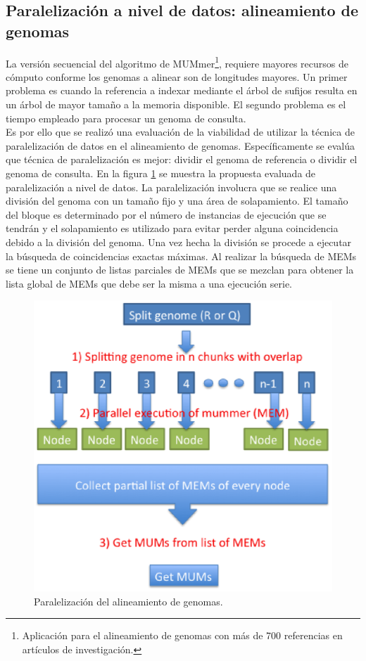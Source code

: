 \documentclass[12pt,a4paper]{article}
\begin{document}
\subsection{Paralelización a nivel de datos: alineamiento de genomas}
\indent
La versión secuencial del algoritmo de MUMmer\footnote{Aplicación para el alineamiento de genomas con más de 700 referencias en artículos de investigación.}, requiere mayores recursos de cómputo conforme los genomas a alinear son de longitudes mayores. Un primer problema es cuando la referencia a indexar mediante el árbol de sufijos resulta en un árbol de mayor tamaño a la memoria disponible. El segundo problema es el tiempo empleado para procesar un genoma de consulta.\\
\indent
Es por ello que se realizó una evaluación de la viabilidad de utilizar la t\'ecnica de paralelización de datos en el alineamiento de genomas. Específicamente se evalúa que t\'ecnica de paralelización es mejor: dividir el genoma de referencia o dividir el genoma de consulta. En la figura \ref{fig:algo} se muestra la propuesta evaluada de paralelización a nivel de datos. La paralelización involucra que se realice una división del genoma con un tamaño fijo y una área de solapamiento. El tamaño del bloque es determinado por el número de instancias de ejecución que se tendrán y el solapamiento es utilizado para evitar perder alguna coincidencia debido a la división del genoma. Una vez hecha la división se procede a ejecutar la búsqueda de coincidencias exactas máximas. Al realizar la búsqueda de MEMs se tiene un conjunto de listas parciales de MEMs que se mezclan para obtener la lista global de MEMs que debe ser la misma a una ejecución serie.\\
   \begin{figure}[h] 
   \centering 
   \includegraphics[scale=0.4]{algorithm.eps} 
   \caption{Paralelización del alineamiento de genomas.} 
   \label{fig:algo} 
 \end{figure}
\end{document}
